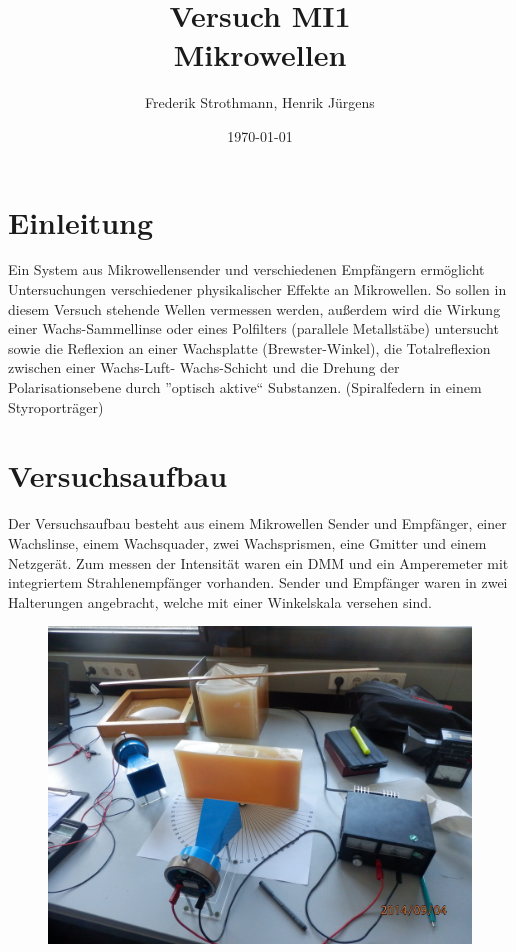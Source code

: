 \documentclass[12pt]{scrartcl}
\title{Versuch MI1\\ Mikrowellen}
\author{Frederik Strothmann, Henrik Jürgens}
\date{\today}
\begin{document}

\maketitle
\tableofcontents
\newpage


\section{Einleitung}

Ein System aus Mikrowellensender und verschiedenen Empfängern ermöglicht Untersuchungen verschiedener physikalischer Effekte an Mikrowellen. So sollen in diesem Versuch stehende Wellen vermessen werden, außerdem wird die Wirkung einer Wachs-Sammellinse oder eines Polfilters (parallele Metallstäbe) untersucht sowie die Reflexion
an einer Wachsplatte (Brewster-Winkel), die Totalreflexion zwischen einer Wachs-Luft-
Wachs-Schicht und die Drehung der Polarisationsebene durch
”optisch aktive“ Substanzen.
(Spiralfedern in einem Styroporträger)

\section{Versuchsaufbau}
Der Versuchsaufbau besteht aus einem Mikrowellen Sender und Empfänger, einer Wachslinse, einem Wachsquader, zwei Wachsprismen, eine Gmitter und einem Netzgerät. Zum messen der Intensität waren ein DMM und ein Amperemeter mit integriertem Strahlenempfänger vorhanden. Sender und Empfänger waren in zwei Halterungen angebracht, welche mit einer Winkelskala versehen sind.

\begin{figure}[H]
	\centering
	\includegraphics[scale= 0.1]{versuchaufbau.JPG}
	\label{fig:versuchsaufbau}
\end{figure}
\end{document}
